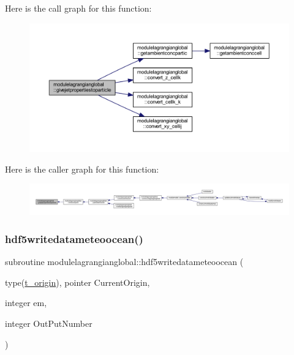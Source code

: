 Here is the call graph for this function\+:\nopagebreak
\begin{figure}[H]
\begin{center}
\leavevmode
\includegraphics[width=350pt]{namespacemodulelagrangianglobal_a24724892759ef0c6bdbe24cb1ecfd00b_cgraph}
\end{center}
\end{figure}
Here is the caller graph for this function\+:\nopagebreak
\begin{figure}[H]
\begin{center}
\leavevmode
\includegraphics[width=350pt]{namespacemodulelagrangianglobal_a24724892759ef0c6bdbe24cb1ecfd00b_icgraph}
\end{center}
\end{figure}
\mbox{\label{namespacemodulelagrangianglobal_ac7151a37e939cec76ecc163750973cfc}} 
\subsubsection{\texorpdfstring{hdf5writedatameteoocean()}{hdf5writedatameteoocean()}}
{\footnotesize\ttfamily subroutine modulelagrangianglobal\+::hdf5writedatameteoocean (\begin{DoxyParamCaption}\item[{type(\mbox{\hyperlink{structmodulelagrangianglobal_1_1t__origin}{t\+\_\+origin}}), pointer}]{Current\+Origin,  }\item[{integer}]{em,  }\item[{integer}]{Out\+Put\+Number }\end{DoxyParamCaption})\hspace{0.3cm}{\ttfamily [private]}}

